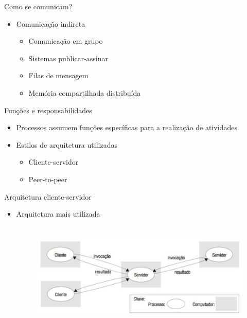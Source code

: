\documentclass[aspectratio=169,
				xcolor=table]{beamer}
\begin{document}
	\begin{frame}{Como se comunicam?}
		\begin{itemize}
			\item Comunicação indireta
			\begin{itemize}
				\item Comunicação em grupo
				\item Sistemas publicar-assinar
				\item Filas de mensagem
				\item Memória compartilhada distribuída
			\end{itemize}
		\end{itemize}
	\end{frame}
	
	\begin{frame}{Funções e responsabilidades}
		\begin{itemize}
			\item Processos assumem funções específicas para a realização de atividades 
			\vspace{1em}
			\item Estilos de arquitetura utilizadas
			\begin{itemize}
				\item Cliente-servidor
				\item Peer-to-peer
			\end{itemize}
		\end{itemize}
	\end{frame}
	
	\begin{frame}{Arquitetura cliente-servidor}
		\begin{itemize}
			\item Arquitetura mais utilizada
			\begin{figure}[hbtp]
			\centering
			\includegraphics[height=5cm, keepaspectratio]{../figs/cap02/clienteservidor.png}
			\end{figure}			
		\end{itemize}
	\end{frame}
	
\end{document}
